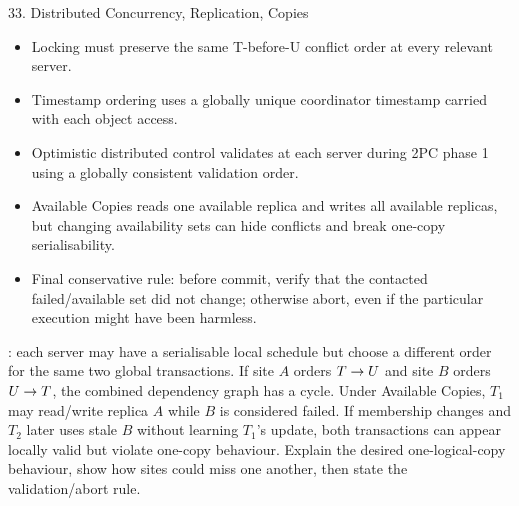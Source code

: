 \begin{topic}{33. Distributed Concurrency, Replication, Copies}
\begin{itemize}
  \item Locking must preserve the same T-before-U conflict order at every relevant server.
  \item Timestamp ordering uses a globally unique coordinator timestamp carried with each object access.
  \item Optimistic distributed control validates at each server during 2PC phase 1 using a globally consistent validation order.
  \item Available Copies reads one available replica and writes all available replicas, but changing availability sets can hide conflicts and break one-copy serialisability.
  \item Final conservative rule: before commit, verify that the contacted failed/available set did not change; otherwise abort, even if the particular execution might have been harmless.
\end{itemize}
: each server may have a serialisable local schedule but choose a different order for the same two global transactions. If site \(A\) orders \(T\rightarrow U\) and site \(B\) orders \(U\rightarrow T\), the combined dependency graph has a cycle.
\worked Under Available Copies, \(T_1\) may read/write replica \(A\) while \(B\) is considered failed. If membership changes and \(T_2\) later uses stale \(B\) without learning \(T_1\)'s update, both transactions can appear locally valid but violate one-copy behaviour.
\answer Explain the desired one-logical-copy behaviour, show how sites could miss one another, then state the validation/abort rule.
\end{topic}


